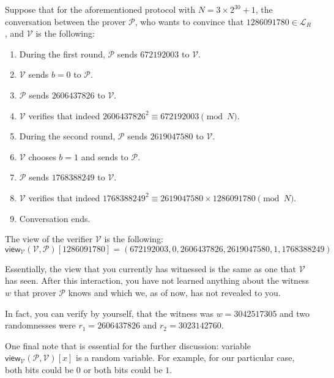 \documentclass[../lecture-notes.tex]{subfiles}
\begin{document}
\begin{example}
    Suppose that for the aforementioned protocol with $N=3 \times 2^{30} + 1$, the conversation between the prover $\mathcal{P}$, who wants to convince that $1286091780 \in \mathcal{L}_R$, and $\mathcal{V}$ is the following:
    \begin{enumerate}
        \item During the first round, $\mathcal{P}$ sends $672192003$ to $\mathcal{V}$.
        \item $\mathcal{V}$ sends $b=0$ to $\mathcal{P}$.
        \item $\mathcal{P}$ sends $2606437826$ to $\mathcal{V}$.
        \item $\mathcal{V}$ verifies that indeed $2606437826^2 \equiv 672192003 \pmod{N}$.
        \item During the second round, $\mathcal{P}$ sends $2619047580$ to $\mathcal{V}$.
        \item $\mathcal{V}$ chooses $b=1$ and sends to $\mathcal{P}$.
        \item $\mathcal{P}$ sends $1768388249$ to $\mathcal{V}$.
        \item $\mathcal{V}$ verifies that indeed $1768388249^2 \equiv 2619047580 \times 1286091780 \pmod{N}$.
        \item Conversation ends.
    \end{enumerate}

    The view of the verifier $\mathcal{V}$ is the following: 
    \begin{equation*}
        \mathsf{view}_{\mathcal{V}}(\mathcal{V}, \mathcal{P})[1286091780] = (672192003, 0, 2606437826, 2619047580, 1, 1768388249)
    \end{equation*}

    Essentially, the view that you currently has witnessed is the same as one that $\mathcal{V}$ has seen. After this interaction, you have not learned anything about the witness $w$ that prover $\mathcal{P}$ knows and which we, as of now, has not revealed to you.

    In fact, you can verify by yourself, that the witness was $w = 3042517305$ and two randomnesses were $r_1 = 2606437826$ and $r_2 = 3023142760$.

    One final note that is essential for the further discussion: variable $\mathsf{view}_{\mathcal{V}}(\mathcal{P}, \mathcal{V})[x]$ is a random variable. For example, for our particular case, both bits could be $0$ or both bits could be $1$. 
\end{example}
\end{document}
